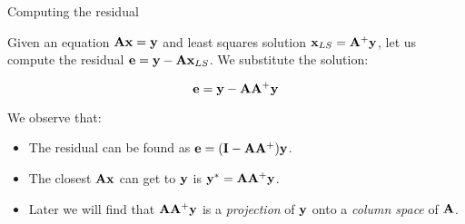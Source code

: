\documentclass{beamer}
\begin{document}
\begin{frame}{Computing the residual}
	\begin{flushleft}
		
		Given an equation $\mathbf{A}\mathbf{x} = \mathbf{y}$ and least squares solution $\mathbf{x}_{LS} = \mathbf{A}^+\mathbf{y}$, let us compute the residual $\mathbf{e} = \mathbf{y} - \mathbf{A}\mathbf{x}_{LS}$. We substitute the solution:
		 
		\begin{equation}
			\mathbf{e} = \mathbf{y} - \mathbf{A}\mathbf{A}^+\mathbf{y}
		\end{equation}
		
		We observe that:
		
		\begin{itemize}
			\item The residual can be found as $\mathbf{e} = (\mathbf{I} - \mathbf{A}\mathbf{A}^+)\mathbf{y}$.
			
			\item The closest $\mathbf{A}\mathbf{x}$ can get to $\mathbf{y}$ is $\mathbf{y}^* = \mathbf{A}\mathbf{A}^+\mathbf{y}$.
			
			\item Later we will find that $\mathbf{A}\mathbf{A}^+\mathbf{y}$ is a \emph{projection} of $\mathbf{y}$ onto a \emph{column space} of $\mathbf{A}$.
		\end{itemize}
		
	\end{flushleft}
\end{frame}





%
%
%
%
\end{document}
